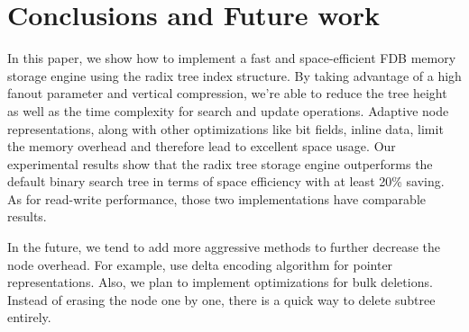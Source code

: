 \documentclass[sigplan,screen,nonacm]{acmart}
\begin{document}
\section{Conclusions and Future work}
In this paper, we show how to implement a fast and space-efficient FDB memory storage engine using the radix tree index structure. By taking advantage of a high fanout parameter and vertical compression, we’re able to reduce the tree height as well as the time complexity for search and update operations. Adaptive node representations, along with other optimizations like bit fields, inline data, limit the memory overhead and therefore lead to excellent space usage. Our experimental results show that the radix tree storage engine outperforms the default binary search tree in terms of space efficiency with at least 20\% saving. As for read-write performance, those two implementations have comparable results. 

In the future, we tend to add more aggressive methods to further decrease the node overhead. For example, use delta encoding algorithm for pointer representations. Also, we plan to implement optimizations for bulk deletions. Instead of erasing the node one by one, there is a quick way to delete subtree entirely.   



\end{document}
